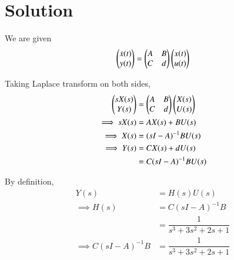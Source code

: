 \documentclass[journal,12pt,twocolumn]{IEEEtran}
\begin{document}
\section{Solution}

We are given 
\begin{equation}
    \begin{pmatrix}\dot{x}(t)\\y(t)\end{pmatrix} = \begin{pmatrix}A & B\\C & d\end{pmatrix}\begin{pmatrix}x(t)\\u(t)\end{pmatrix}
\end{equation}
    
Taking Laplace transform on both sides,
\begin{align}
    \begin{pmatrix}sX(s)\\Y(s)\end{pmatrix} &= \begin{pmatrix}A & B\\ C & d\end{pmatrix}\begin{pmatrix}X(s)\\U(s)\end{pmatrix}\\
    \implies sX(s) &= AX(s)+BU(s)\\
    \implies X(s) &= (sI-A)^{-1} BU(s)\\
    \implies Y(s) &= CX(s)+dU(s)\\ 
                  &= C(sI-A)^{-1} BU(s)
\end{align}

By definition, 
\begin{align}
    Y(s) &= H(s)U(s)\\
    \implies H(s) &= C(sI-A)^{-1} B\\
                  &= \dfrac{1}{s^3+3s^2+2s+1}\\
    \implies C(sI-A)^{-1} B &= \dfrac{1}{s^3+3s^2+2s+1}\label{result}
\end{align} 
\end{document}
